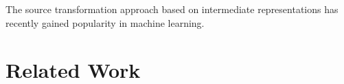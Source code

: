 The source transformation approach based on intermediate representations has recently gained
popularity in machine learning.



\section{Related Work}
\label{sec:related-work}



